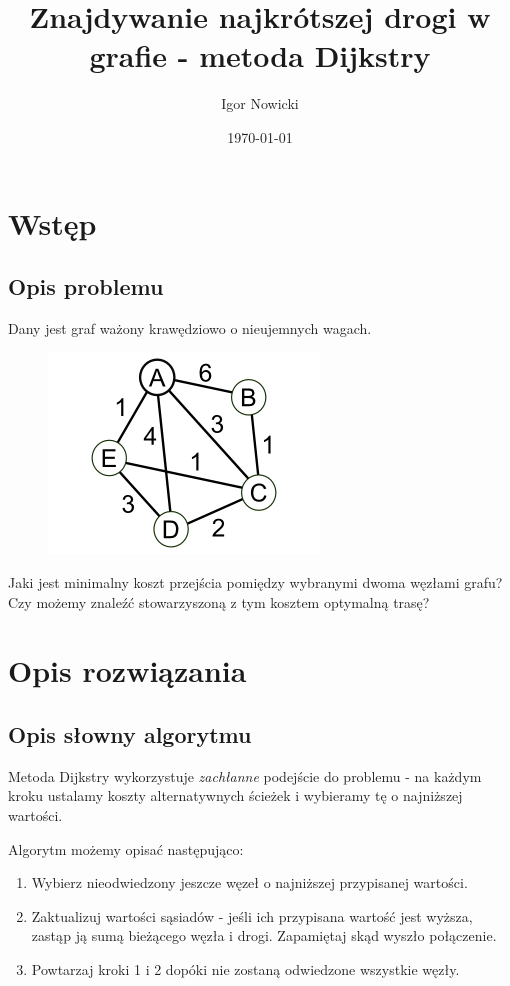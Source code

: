 \documentclass{beamer}
\title{Znajdywanie najkrótszej drogi w grafie - metoda Dijkstry}
\author{Igor Nowicki}
\date{\today}
\institute{WIT - Wyższa Szkoła Informatyki Stosowanej i Zarządzania}
\begin{document}
\begin{frame}
	\titlepage
\end{frame}
\section{Wstęp}
\subsection{Opis problemu}

\begin{frame}
	Dany jest graf ważony krawędziowo o nieujemnych wagach.

	\begin{figure}
			\centering
			\includegraphics[width=0.4\linewidth]{i00.png}


	\end{figure}

	\pause
	Jaki jest minimalny koszt przejścia pomiędzy wybranymi dwoma węzłami grafu?
\pause
Czy możemy znaleźć stowarzyszoną z tym kosztem optymalną trasę?

\end{frame}

\section{Opis rozwiązania}
\subsection{Opis słowny algorytmu}
\begin{frame}
	Metoda Dijkstry wykorzystuje \emph{zachłanne} podejście do problemu - na każdym kroku ustalamy koszty alternatywnych ścieżek i wybieramy tę o najniższej wartości.
	\pause

	\bigskip
	Algorytm możemy opisać następująco:
	\begin{enumerate}
		\pause
		\item Wybierz nieodwiedzony jeszcze węzeł o najniższej przypisanej wartości.
		      \pause
		\item Zaktualizuj wartości sąsiadów - jeśli ich przypisana wartość jest wyższa, zastąp ją sumą bieżącego węzła i drogi. Zapamiętaj skąd wyszło połączenie.
		      \pause
		\item Powtarzaj kroki 1 i 2 dopóki nie zostaną odwiedzone wszystkie węzły.
	\end{enumerate}
\end{frame}
\end{document}
